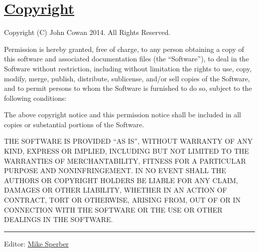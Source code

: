 \section{\texorpdfstring{\href{}{Copyright}}{Copyright}}\label{copyright}

Copyright (C) John Cowan 2014. All Rights Reserved.

Permission is hereby granted, free of charge, to any person obtaining a
copy of this software and associated documentation files (the
``Software''), to deal in the Software without restriction, including
without limitation the rights to use, copy, modify, merge, publish,
distribute, sublicense, and/or sell copies of the Software, and to
permit persons to whom the Software is furnished to do so, subject to
the following conditions:

The above copyright notice and this permission notice shall be included
in all copies or substantial portions of the Software.

THE SOFTWARE IS PROVIDED ``AS IS'', WITHOUT WARRANTY OF ANY KIND,
EXPRESS OR IMPLIED, INCLUDING BUT NOT LIMITED TO THE WARRANTIES OF
MERCHANTABILITY, FITNESS FOR A PARTICULAR PURPOSE AND NONINFRINGEMENT.
IN NO EVENT SHALL THE AUTHORS OR COPYRIGHT HOLDERS BE LIABLE FOR ANY
CLAIM, DAMAGES OR OTHER LIABILITY, WHETHER IN AN ACTION OF CONTRACT,
TORT OR OTHERWISE, ARISING FROM, OUT OF OR IN CONNECTION WITH THE
SOFTWARE OR THE USE OR OTHER DEALINGS IN THE SOFTWARE.

\begin{center}\rule{0.5\linewidth}{\linethickness}\end{center}

Editor:
\href{mailto:srfi-editors\%20at\%20srfi\%20dot\%20schemers\%20dot\%20org}{Mike
Sperber}
